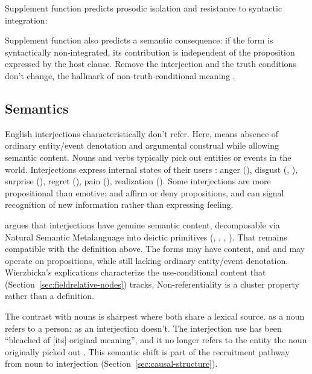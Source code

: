 \documentclass[12pt]{article}
\begin{document}
Supplement function predicts prosodic isolation and resistance to
syntactic integration:

\ea\label{ex:syntactic-predictions}
  \ex {}
  \z
\z
Supplement function also predicts a semantic consequence: if the form is
syntactically non-integrated, its contribution is independent of the
proposition expressed by the host clause. Remove the interjection and the
truth conditions don't change, the hallmark of non-truth-conditional
meaning \citep[cf.][166]{potts2007}.

\subsection{Semantics}

English interjections characteristically don't refer. Here,
 means absence of ordinary entity/event
denotation and argumental construal while allowing semantic content.
Nouns and verbs typically pick out entities or events in the world.
Interjections express internal states of their users
\citep{leech2006}: anger (),
disgust (, ), surprise (), regret
(), pain (), realization ().
Some interjections are more propositional than emotive: 
and  affirm or deny propositions, and  can
signal recognition of new information rather than expressing feeling.

\textcite{wierzbicka1992} argues that interjections have genuine
semantic content, decomposable via Natural Semantic Metalanguage into
deictic primitives (, , ,
). That remains compatible with the definition above. The
forms may have content, and  and  may operate
on propositions, while still lacking ordinary entity/event denotation.
Wierzbicka's explications characterize the use-conditional content that
 (Section~\ref{sec:fieldrelative-nodes})
tracks. Non-referentiality is a cluster property rather than a
definition.

The contrast with nouns is sharpest where both share a lexical source.
 as a noun refers to a person;  as an
interjection doesn't. The interjection use has been
\enquote{bleached of [its] original meaning}, and it no longer refers to
the entity the noun originally picked out \citep[72]{gehweiler2008}.
This semantic shift is part of the recruitment pathway from noun to
interjection (Section~\ref{sec:causal-structure}).
\end{document}
